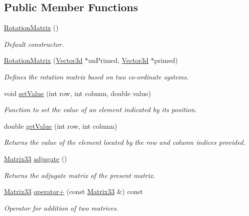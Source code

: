 \subsection*{Public Member Functions}
\begin{DoxyCompactItemize}
\item 
\hyperlink{classRotationMatrix_a4678658c45a6b89f2d06c48b318e2769}{Rotation\-Matrix} ()
\begin{DoxyCompactList}\small\item\em Default constructor. \end{DoxyCompactList}\item 
\hyperlink{classRotationMatrix_aa5506a5341c05e42d258a93137635a9b}{Rotation\-Matrix} (\hyperlink{classVector3d}{Vector3d} $\ast$un\-Primed, \hyperlink{classVector3d}{Vector3d} $\ast$primed)
\begin{DoxyCompactList}\small\item\em Defines the rotation matrix based on two co-\/ordinate systems. \end{DoxyCompactList}\item 
void \hyperlink{classMatrix33_a6cdcec77fd089b2e73ad7ae85ecff30b}{set\-Value} (int row, int column, double value)
\begin{DoxyCompactList}\small\item\em Function to set the value of an element indicated by its position. \end{DoxyCompactList}\item 
double \hyperlink{classMatrix33_a849bbdf7b456ddacf7185b087fca4015}{get\-Value} (int row, int column)
\begin{DoxyCompactList}\small\item\em Returns the value of the element located by the row and column indices provided. \end{DoxyCompactList}\item 
\hyperlink{classMatrix33}{Matrix33} \hyperlink{classMatrix33_a4e64ab5af4921c24b8270a0c9050f4ba}{adjugate} ()
\begin{DoxyCompactList}\small\item\em Returns the adjugate matrix of the present matrix. \end{DoxyCompactList}\item 
\hyperlink{classMatrix33}{Matrix33} \hyperlink{classMatrix33_adc58ec5739c9250ff1150c725d0e868e}{operator+} (const \hyperlink{classMatrix33}{Matrix33} \&) const 
\begin{DoxyCompactList}\small\item\em Operator for addition of two matrices. \end{DoxyCompactList}\item 

\end{DoxyCompactItemize}
